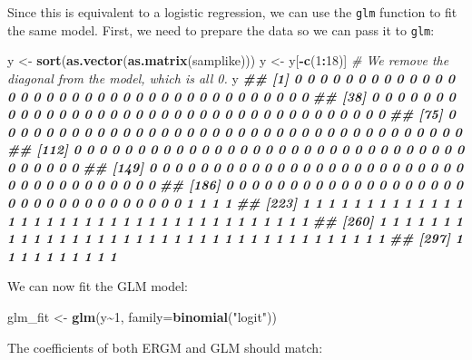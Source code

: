 \documentclass[
]{book}
\newenvironment{Shaded}{\begin{snugshade}}{\end{snugshade}}
\newcommand{\AttributeTok}[1]{\textcolor[rgb]{0.13,0.29,0.53}{#1}}
\newcommand{\CommentTok}[1]{\textcolor[rgb]{0.56,0.35,0.01}{\textit{#1}}}
\newcommand{\DecValTok}[1]{\textcolor[rgb]{0.00,0.00,0.81}{#1}}
\newcommand{\DocumentationTok}[1]{\textcolor[rgb]{0.56,0.35,0.01}{\textbf{\textit{#1}}}}
\newcommand{\FunctionTok}[1]{\textcolor[rgb]{0.13,0.29,0.53}{\textbf{#1}}}
\newcommand{\NormalTok}[1]{#1}
\newcommand{\OtherTok}[1]{\textcolor[rgb]{0.56,0.35,0.01}{#1}}
\newcommand{\SpecialCharTok}[1]{\textcolor[rgb]{0.81,0.36,0.00}{\textbf{#1}}}
\newcommand{\StringTok}[1]{\textcolor[rgb]{0.31,0.60,0.02}{#1}}
\begin{document}
Since this is equivalent to a logistic regression, we can use the \texttt{glm} function to fit the same model. First, we need to prepare the data so we can pass it to \texttt{glm}:

\begin{Shaded}
\begin{Highlighting}[]
\NormalTok{y }\OtherTok{\textless{}{-}} \FunctionTok{sort}\NormalTok{(}\FunctionTok{as.vector}\NormalTok{(}\FunctionTok{as.matrix}\NormalTok{(samplike)))}
\NormalTok{y }\OtherTok{\textless{}{-}}\NormalTok{ y[}\SpecialCharTok{{-}}\FunctionTok{c}\NormalTok{(}\DecValTok{1}\SpecialCharTok{:}\DecValTok{18}\NormalTok{)] }\CommentTok{\# We remove the diagonal from the model, which is all 0.}
\NormalTok{y}
\DocumentationTok{\#\#   [1] 0 0 0 0 0 0 0 0 0 0 0 0 0 0 0 0 0 0 0 0 0 0 0 0 0 0 0 0 0 0 0 0 0 0 0 0 0}
\DocumentationTok{\#\#  [38] 0 0 0 0 0 0 0 0 0 0 0 0 0 0 0 0 0 0 0 0 0 0 0 0 0 0 0 0 0 0 0 0 0 0 0 0 0}
\DocumentationTok{\#\#  [75] 0 0 0 0 0 0 0 0 0 0 0 0 0 0 0 0 0 0 0 0 0 0 0 0 0 0 0 0 0 0 0 0 0 0 0 0 0}
\DocumentationTok{\#\# [112] 0 0 0 0 0 0 0 0 0 0 0 0 0 0 0 0 0 0 0 0 0 0 0 0 0 0 0 0 0 0 0 0 0 0 0 0 0}
\DocumentationTok{\#\# [149] 0 0 0 0 0 0 0 0 0 0 0 0 0 0 0 0 0 0 0 0 0 0 0 0 0 0 0 0 0 0 0 0 0 0 0 0 0}
\DocumentationTok{\#\# [186] 0 0 0 0 0 0 0 0 0 0 0 0 0 0 0 0 0 0 0 0 0 0 0 0 0 0 0 0 0 0 0 0 0 1 1 1 1}
\DocumentationTok{\#\# [223] 1 1 1 1 1 1 1 1 1 1 1 1 1 1 1 1 1 1 1 1 1 1 1 1 1 1 1 1 1 1 1 1 1 1 1 1 1}
\DocumentationTok{\#\# [260] 1 1 1 1 1 1 1 1 1 1 1 1 1 1 1 1 1 1 1 1 1 1 1 1 1 1 1 1 1 1 1 1 1 1 1 1 1}
\DocumentationTok{\#\# [297] 1 1 1 1 1 1 1 1 1 1}
\end{Highlighting}
\end{Shaded}

We can now fit the GLM model:

\begin{Shaded}
\begin{Highlighting}[]
\NormalTok{glm\_fit }\OtherTok{\textless{}{-}} \FunctionTok{glm}\NormalTok{(y}\SpecialCharTok{\textasciitilde{}}\DecValTok{1}\NormalTok{, }\AttributeTok{family=}\FunctionTok{binomial}\NormalTok{(}\StringTok{"logit"}\NormalTok{))}
\end{Highlighting}
\end{Shaded}

The coefficients of both ERGM and GLM should match:
\end{document}

